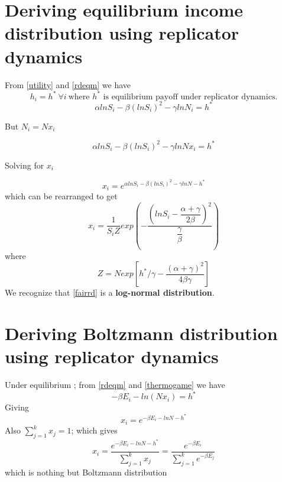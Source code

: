 \documentclass[letterpaper,english,10pt]{article}
\begin{document}
 \section{Deriving equilibrium income distribution using replicator dynamics}
 From \ref{utility} and \ref{rdeqm} we have 
 \begin{equation}
     h_i = h^* ~\forall i ~\text{where $h^*$ is equilibrium payoff under replicator dynamics.} 
 \end{equation}
 \begin{equation}
     \alpha ln S_i - \beta (ln S_i)^2 -\gamma ln N_i = h^* 
 \end{equation}
 
 But $N_i = Nx_i$
 
 \begin{equation}
     \alpha ln S_i - \beta (ln S_i)^2 -\gamma ln Nx_i = h^* 
 \end{equation}
 
 Solving for $x_i$
 
 \begin{equation}
     x_i = e^{\alpha ln S_i - \beta (ln S_i)^2 -\gamma ln N - h^*}
 \end{equation}
 which can be rearranged to get 
 \begin{equation}\label{fairrd}
     x_i = \dfrac{1}{S_i Z}exp(-\dfrac{(lnS_i - \dfrac{\alpha+\gamma}{2\beta})^2 }{\dfrac{\gamma}{\beta}})
 \end{equation}
 where 
 \begin{equation}
     Z = N exp[h^*/\gamma - \dfrac{(\alpha + \gamma)^2}{4\beta \gamma}]
 \end{equation}
 We recognize that \ref{fairrd} is a \textbf{log-normal distribution}.
 \section{Deriving Boltzmann distribution using replicator dynamics }
     Under equilibrium ; from \ref{rdeqm} and \ref{thermogame} we have 
     \begin{equation}
         -\beta E_i -ln(Nx_i) = h^*
     \end{equation}
     Giving
     \begin{equation}
         x_i = e^{-\beta E_i -ln N -h^*}
     \end{equation}
     Also $\sum_{j=1}^{k}x_j=1$; which gives
     \begin{equation}
         x_i = \frac{e^{-\beta E_i -ln N -h^*}}{\sum_{j=1}^{k}x_j} = \frac{e^{-\beta E_i}}{\sum_{j=1}^{k}e^{-\beta E_j}}
     \end{equation}
     which is nothing but Boltzmann distribution 
     
\end{document}
